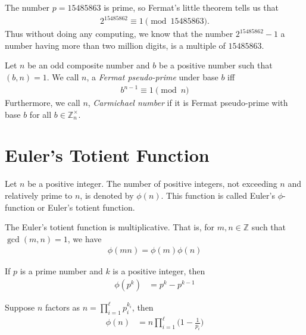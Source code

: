 \documentclass[a4paper, 12pt]{book} %
\begin{document}
\begin{example}
    The number $p = 15485863$ is prime, so Fermat's little theorem tells us that
    \begin{align}
        2^{15485862} \equiv 1 \pmod{15485863}.
    \end{align}
    Thus without doing any computing, we know that the number $2^{15485862}-1$ a number having more than two million digits, is a multiple of $15485863$.
\end{example}

\begin{definition}
   Let $n$ be an odd composite number and $b$ be a positive number such that $(b, n) = 1$. We call $n$, a \emph{Fermat pseudo-prime} under base $b$ iff 
   \begin{align}
    b^{n-1} \equiv 1 \pmod n
   \end{align} 
   Furthermore, we call $n$, \emph{Carmichael number} if it is Fermat pseudo-prime with base $b$ for all $b \in \mathbb{Z}_n^\times$.
\end{definition}



\section{Euler's Totient Function}
\begin{definition}
    Let $n$ be a positive integer. The number of positive integers, not exceeding $n$ and relatively prime to $n$, is denoted by $\phi(n)$. This function is called Euler's $\phi$-function or Euler's totient function.
\end{definition}

\begin{proposition}
    The Euler's totient function is multiplicative. That is, for $m, n \in \mathbb{Z}$ such that $\gcd(m, n) = 1$, we have 
    \begin{align}
        \phi(mn) = \phi(m) \phi(n)
    \end{align}
\end{proposition}

\begin{proposition}
    If $p$ is a prime number and $k$ is a positive integer, then 
    \begin{align}
        \phi(p^k) &= p^k - p^{k-1}
    \end{align}
\end{proposition}


\begin{proposition}
    Suppose $n$ factors as $n = \prod_{i=1}^\ell p_i^{k_i}$, then 
    \begin{align}
        \phi(n) &= n \prod_{i=1}^\ell \bigg( 1 - \frac{1}{p_i}\bigg)
    \end{align}
\end{proposition}
\end{document}
